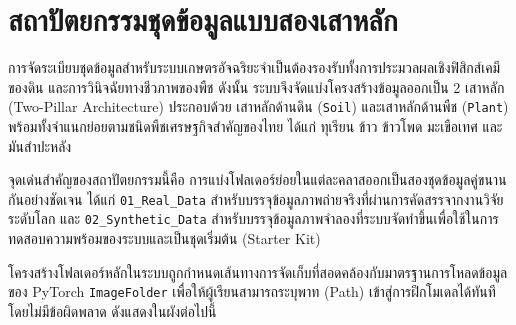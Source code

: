 \chapter{สถาปัตยกรรมชุดข้อมูลแบบสองเสาหลัก}
\label{ch:dataset_architecture}

การจัดระเบียบชุดข้อมูลสำหรับระบบเกษตรอัจฉริยะจำเป็นต้องรองรับทั้งการประมวลผลเชิงฟิสิกส์เคมีของดิน และการวินิจฉัยทางชีวภาพของพืช ดังนั้น ระบบจึงจัดแบ่งโครงสร้างข้อมูลออกเป็น 2 เสาหลัก (Two-Pillar Architecture) ประกอบด้วย เสาหลักด้านดิน (\texttt{Soil}) และเสาหลักด้านพืช (\texttt{Plant}) พร้อมทั้งจำแนกย่อยตามชนิดพืชเศรษฐกิจสำคัญของไทย ได้แก่ ทุเรียน ข้าว ข้าวโพด มะเขือเทศ และมันสำปะหลัง

จุดเด่นสำคัญของสถาปัตยกรรมนี้คือ การแบ่งโฟลเดอร์ย่อยในแต่ละคลาสออกเป็นสองชุดข้อมูลคู่ขนานกันอย่างชัดเจน ได้แก่ \texttt{01\_Real\_Data} สำหรับบรรจุข้อมูลภาพถ่ายจริงที่ผ่านการคัดสรรจากงานวิจัยระดับโลก และ \texttt{02\_Synthetic\_Data} สำหรับบรรจุข้อมูลภาพจำลองที่ระบบจัดทำขึ้นเพื่อใช้ในการทดสอบความพร้อมของระบบและเป็นชุดเริ่มต้น (Starter Kit)

\label{sec:directory_tree}

โครงสร้างโฟลเดอร์หลักในระบบถูกกำหนดเส้นทางการจัดเก็บที่สอดคล้องกับมาตรฐานการโหลดข้อมูลของ PyTorch \texttt{ImageFolder} เพื่อให้ผู้เรียนสามารถระบุพาท (Path) เข้าสู่การฝึกโมเดลได้ทันทีโดยไม่มีข้อผิดพลาด ดังแสดงในผังต่อไปนี้

